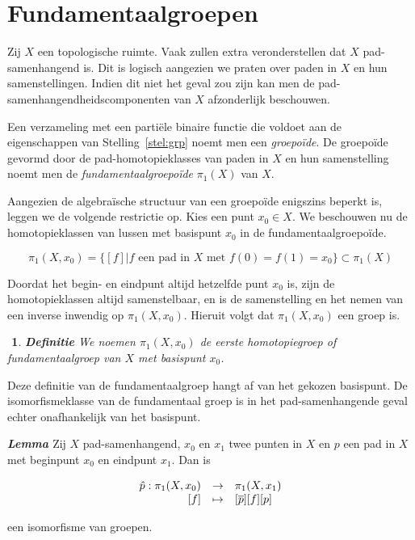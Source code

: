 \documentclass[12pt]{book}
\newenvironment{lem}{\begin{lemh}{\em {\bf Lemma }}}{\end{lemh}}
\newtheorem{dfh}[stelh]{$\!\!$}
\newenvironment{df}{\begin{dfh} \em {\bf Definitie }}{\end{dfh}}
\begin{document}
\section{Fundamentaalgroepen}
Zij $X$ een topologische ruimte. Vaak zullen extra veronderstellen dat $X$ pad-samenhangend is. Dit is logisch  aangezien we praten over paden in $X$ en hun samenstellingen. Indien dit niet het geval zou zijn kan men de pad-samenhangendheidscomponenten van $X$ afzonderlijk beschouwen.

Een verzameling met een parti\"ele binaire functie die voldoet aan de eigenschappen van Stelling~\ref{stel:grp} noemt men een \emph{groepo\"ide}. De groepo\"ide gevormd door de pad-homotopieklasses van paden in $X$ en hun samenstelling noemt men de \emph{fundamentaalgroepo\"ide} $\pi_1(X)$ van $X$.

Aangezien de algebra\"ische structuur van een groepo\"ide enigszins beperkt is, leggen we de volgende restrictie op. Kies een punt $x_0 \in X$. We beschouwen nu de homotopieklassen van lussen met  basispunt $x_0$ in de fundamentaalgroepo\"ide.

$$\pi_{1}(X,x_0)=\{[f]|f \mbox{ een pad in } X \mbox{ met } f(0)=f(1)=x_0\} \subset \pi_1(X)$$

Doordat het begin- en eindpunt altijd hetzelfde punt $x_0$ is, zijn de homotopieklassen altijd samenstelbaar, en is de samenstelling en het nemen van een inverse inwendig op $\pi_{1}(X,x_0)$. Hieruit volgt dat $\pi_1(X,x_0)$ een groep is.


\begin{df}
We noemen $\pi_1(X, x_0)$ de {\em eerste homotopiegroep} of {\em fundamentaalgroep} van $X$ met
basispunt $x_0$. 
\end{df}

Deze definitie van de fundamentaalgroep hangt af van het gekozen basispunt. De isomorfismeklasse van de fundamentaal groep is in het pad-samenhangende geval echter onafhankelijk van het basispunt. 

\begin{lem}\label{pix0-pix1}
Zij $X$ pad-samenhangend, $x_0$ en $x_1$ twee punten in $X$ en $p$ een pad in $X$ met beginpunt $x_0$ en eindpunt $x_1$. Dan is 

$$\begin{array}{rcl}
\hat{p}:\pi_{1}(X,x_0) & \to & \pi_{1}(X,x_1)\\
\rule{0mm}{0mm}[f] & \mapsto & [\overline{p}][f][p]\end{array} 
$$

een isomorfisme van groepen.
\end{lem}
\end{document}
